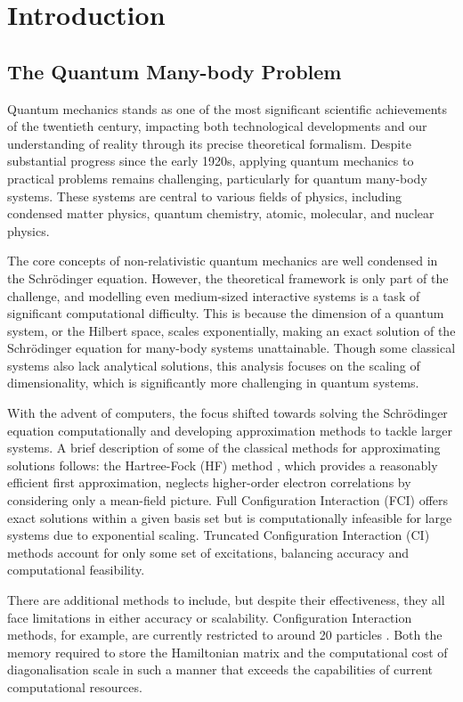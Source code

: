 \chapter{Introduction}
\section{The Quantum Many-body Problem}

Quantum mechanics stands as one of the most significant scientific achievements of the twentieth century, impacting both technological developments and our understanding of reality through its precise theoretical formalism. Despite substantial progress since the early 1920s, applying quantum mechanics to practical problems remains challenging, particularly for quantum many-body systems. These systems are central to various fields of physics, including condensed matter physics, quantum chemistry, atomic, molecular, and nuclear physics.

The core concepts of non-relativistic quantum mechanics are well condensed in the Schrödinger equation. However, the theoretical framework is only part of the challenge, and modelling even medium-sized interactive systems is a task of significant computational difficulty. This is because the dimension of a quantum system, or the Hilbert space, scales exponentially, making an exact solution of the Schrödinger equation for many-body systems unattainable. Though some classical systems also lack analytical solutions, this analysis focuses on the scaling of dimensionality, which is significantly more challenging in quantum systems.

With the advent of computers, the focus shifted towards solving the Schrödinger equation computationally and developing approximation methods to tackle larger systems. A brief description of some of the classical methods for approximating solutions follows: the Hartree-Fock (HF) method \cite{szabo2012modern}, which provides a reasonably efficient first approximation, neglects higher-order electron correlations by considering only a mean-field picture. Full Configuration Interaction (FCI) \cite{szabo2012modern} offers exact solutions within a given basis set but is computationally infeasible for large systems due to exponential scaling. Truncated Configuration Interaction (CI) methods \cite{Shavitt_Bartlett_2009} account for only some set of excitations, balancing accuracy and computational feasibility.

There are additional methods to include, but despite their effectiveness, they all face limitations in either accuracy or scalability. Configuration Interaction methods, for example, are currently restricted to around 20 particles \cite{vogiatzis2017pushing}. Both the memory required to store the Hamiltonian matrix and the computational cost of diagonalisation scale in such a manner that exceeds the capabilities of current computational resources.

